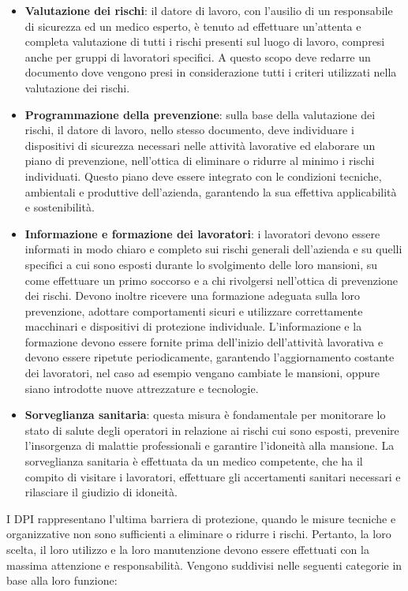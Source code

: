 \begin{itemize}
    \item \textbf{Valutazione dei rischi}: il datore di lavoro, con l'ausilio di un responsabile di sicurezza ed un medico esperto, è tenuto ad effettuare un'attenta e completa valutazione di tutti i rischi presenti sul luogo di lavoro, compresi anche per gruppi di lavoratori specifici. A questo scopo deve redarre un documento dove vengono presi in considerazione tutti i criteri utilizzati nella valutazione dei rischi.
    \item \textbf{Programmazione della prevenzione}: sulla base della valutazione dei rischi, il datore di lavoro, nello stesso documento, deve individuare i dispositivi di sicurezza necessari nelle attività lavorative ed elaborare un piano di prevenzione, nell'ottica di eliminare o ridurre al minimo i rischi individuati. Questo piano deve essere integrato con le condizioni tecniche, ambientali e produttive dell'azienda, garantendo la sua effettiva applicabilità e sostenibilità.
    \item \textbf{Informazione e formazione dei lavoratori}: i lavoratori devono essere informati in modo chiaro e completo sui rischi generali dell'azienda e su quelli specifici a cui sono esposti durante lo svolgimento delle loro mansioni, su come effettuare un primo soccorso e a chi rivolgersi nell'ottica di prevenzione dei rischi. Devono inoltre ricevere una formazione adeguata sulla loro prevenzione, adottare comportamenti sicuri e utilizzare correttamente macchinari e dispositivi di protezione individuale. L'informazione e la formazione devono essere fornite prima dell'inizio dell'attività lavorativa e devono essere ripetute periodicamente, garantendo l'aggiornamento costante dei lavoratori, nel caso ad esempio vengano cambiate le mansioni, oppure siano introdotte nuove attrezzature e tecnologie.
    \item \textbf{Sorveglianza sanitaria}: questa misura è fondamentale per monitorare lo stato di salute degli operatori in relazione ai rischi cui sono esposti, prevenire l'insorgenza di malattie professionali e garantire l'idoneità alla mansione. La sorveglianza sanitaria è effettuata da un medico competente, che ha il compito di visitare i lavoratori, effettuare gli accertamenti sanitari necessari e rilasciare il giudizio di idoneità.
\end{itemize}




\noindent I DPI rappresentano l'ultima barriera di protezione, quando le misure tecniche e organizzative non sono sufficienti a eliminare o ridurre i rischi. Pertanto, la loro scelta, il loro utilizzo e la loro manutenzione devono essere effettuati con la massima attenzione e responsabilità. Vengono suddivisi nelle seguenti categorie in base alla loro funzione:

